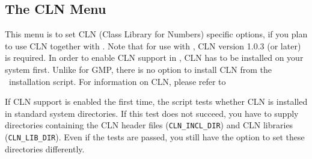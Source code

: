 
\subsection{The CLN Menu}\label{sec:cln-menu}

This menu is to set CLN (Class Library for Numbers) specific options,
if you plan to use CLN together with \cgal . Note that for use with
\cgal, CLN version 1.0.3 (or later) is required. In order to enable
CLN support in \cgal, CLN has to be installed on your system first.
Unlike for GMP, there is no option to install CLN from the \cgal\ 
installation script.  For information on CLN, please refer to
\begin{quote}
  \clnpage
\end{quote}

If CLN support is enabled the first time, the script tests whether CLN
is installed in standard system directories. If this test does not
succeed, you have to supply directories containing the CLN header
files (\texttt{CLN\_INCL\_DIR})\TTindex{CLN\_INCL\_DIR} and CLN
libraries ({\tt CLN\_LIB\_DIR}). Even if the
tests are passed, you still have the option to set these directories
differently.\bigskip

